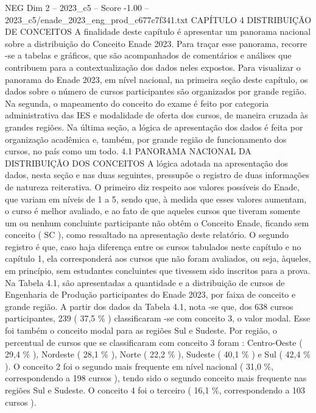\begin{textsample}{NEG Dim 2 – 2023\_c5 – Score -1.00 – 2023\_c5/enade\_2023\_eng\_prod\_c677c7f341.txt}  \label{ex:f2_neg_177}
CAPÍTULO 4 DISTRIBUIÇÃO DE CONCEITOS A finalidade deste capítulo é apresentar um panorama nacional sobre a distribuição do Conceito Enade 2023.
Para traçar esse panorama, recorre -se a tabelas e gráficos, que são acompanhados de comentários e análises que contribuem para a contextualização dos dados neles expostos.
Para visualizar o panorama do Enade 2023, em nível nacional, na primeira seção deste capítulo, os dados sobre o número de cursos participantes são organizados por grande região.
Na segunda, o mapeamento do conceito do exame é feito por categoria administrativa das IES e modalidade de oferta dos cursos, de maneira cruzada às grandes regiões.
Na última seção, a lógica de apresentação dos dados é feita por organização acadêmica e, também, por grande região de funcionamento dos cursos, no país como um todo. 4.1 PANORAMA NACIONAL DA DISTRIBUIÇÃO DOS CONCEITOS A lógica adotada na apresentação dos dados, nesta seção e nas duas seguintes, pressupõe o registro de duas informações de natureza reiterativa.
O primeiro diz respeito aos valores possíveis do Enade, que variam em níveis de 1 a 5, sendo que, à medida que esses valores aumentam, o curso é melhor avaliado, e ao fato de que aqueles cursos que tiveram somente um ou nenhum concluinte participante não obtêm o Conceito Enade, ficando sem conceito ( SC ), como ressaltado na apresentação deste relatório.
O segundo registro é que, caso haja diferença entre os cursos tabulados neste capítulo e no capítulo 1, ela corresponderá aos cursos que não foram avaliados, ou seja, àqueles, em princípio, sem estudantes concluintes que tivessem sido inscritos para a prova.
Na Tabela 4.1, são apresentadas a quantidade e a distribuição de cursos de Engenharia de Produção participantes do Enade 2023, por faixa de conceito e grande região.
A partir dos dados da Tabela 4.1, nota -se que, dos 638 cursos participantes, 239 ( 37,5 \% ) classificaram -se com conceito 3, o valor modal.
Esse foi também o conceito modal para as regiões Sul e Sudeste.
Por região, o percentual de cursos que se classificaram com conceito 3 foram : Centro-Oeste ( 29,4 \% ), Nordeste ( 28,1 \% ), Norte ( 22,2 \% ), Sudeste ( 40,1 \% ) e Sul ( 42,4 \% ).
O conceito 2 foi o segundo mais frequente em nível nacional ( 31,0 \%, correspondendo a 198 cursos ), tendo sido o segundo conceito mais frequente nas regiões Sul e Sudeste.
O conceito 4 foi o terceiro ( 16,1 \%, correspondendo a 103 cursos ).

\end{textsample}
